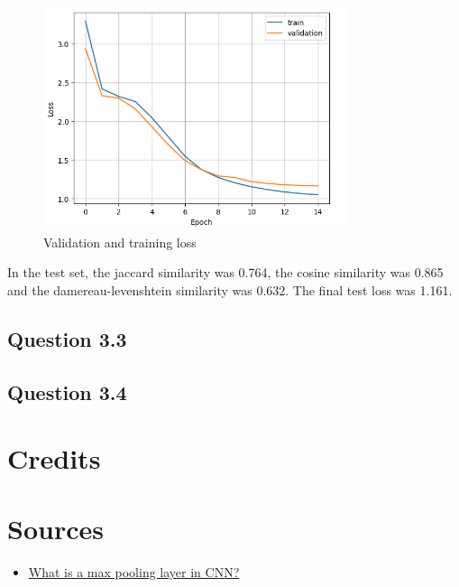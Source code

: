 \documentclass{article}
\begin{document}
\begin{figure}[H]
    \centering
    \includegraphics[width=0.8\textwidth]{../report/plots/Transformer-valid-train-loss.png}
    \caption{Validation and training loss}
    \label{fig:transformer-valid-train-loss}
\end{figure}


In the test set, the jaccard similarity was 0.764, the cosine similarity was 0.865 and the damereau-levenshtein similarity was 0.632. The final test loss was 1.161.

\subsection{Question 3.3}

\subsection{Question 3.4}

\section{Credits}

\section{Sources}

\begin{itemize}
    \item \href{https://www.educative.io/answers/what-is-a-max-pooling-layer-in-cnn}{What is a max pooling layer in CNN?}
\end{itemize}
\end{document}
